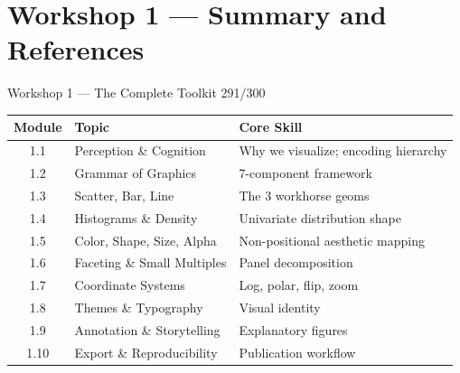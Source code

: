\documentclass[10pt]{beamer}
\newcommand{\smark}[1]{\hfill{\scriptsize\color{codegray}#1}}
\begin{document}
\section{Workshop 1 --- Summary and References}

\begin{frame}{Workshop 1 --- The Complete Toolkit}
\smark{291/300}
\centering\small
\begin{tabular}{@{}cll@{}}
    \toprule
    \textbf{Module} & \textbf{Topic} & \textbf{Core Skill} \\
    \midrule
    1.1  & Perception \& Cognition     & Why we visualize; encoding hierarchy \\
    1.2  & Grammar of Graphics         & 7-component framework \\
    1.3  & Scatter, Bar, Line          & The 3 workhorse geoms \\
    1.4  & Histograms \& Density       & Univariate distribution shape \\
    1.5  & Color, Shape, Size, Alpha   & Non-positional aesthetic mapping \\
    1.6  & Faceting \& Small Multiples & Panel decomposition \\
    1.7  & Coordinate Systems          & Log, polar, flip, zoom \\
    1.8  & Themes \& Typography        & Visual identity \\
    1.9  & Annotation \& Storytelling  & Explanatory figures \\
    1.10 & Export \& Reproducibility   & Publication workflow \\
    \bottomrule
\end{tabular}
\end{frame}
\end{document}
